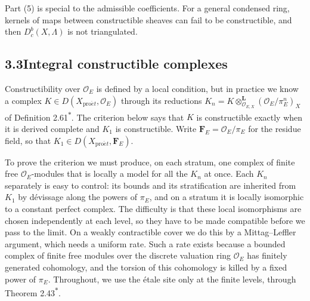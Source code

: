 \documentclass[11pt]{article}
\newcommand{\bpout}[1]{#1\textsuperscript{\hyperlink{bp-outside}{\ensuremath{\ast}}}}
\providecommand{\Dbc}{}\renewcommand{\Dbc}{D^b_c}
\begin{document}
\label{bp12}%
Part (5) is special to the admissible coefficients. For a general condensed ring, kernels of maps between constructible sheaves can fail to be constructible, and then \(\Dbc(X,\Lambda)\) is not triangulated.


\subsection*{\texorpdfstring{3.3\quad Integral constructible complexes}{3.3 Integral constructible complexes}}
\label{bp13}%
\label{bp14}%
Constructibility over \(\mathcal O_E\) is defined by a local condition, but in practice we know a complex \(K\in D(X_{\mathrm{pro}\acute{e}t},\mathcal O_E)\) through its reductions \(K_n=K\otimes^{\mathbf L}_{\mathcal O_{E,X}}(\mathcal O_E/\pi_E^n)_X\) of Definition \bpout{2.61}. The criterion below says that \(K\) is constructible exactly when it is derived complete and \(K_1\) is constructible. Write \(\mathbf F_E=\mathcal O_E/\pi_E\) for the residue field, so that \(K_1\in D(X_{\mathrm{pro}\acute{e}t},\mathbf F_E)\).

To prove the criterion we must produce, on each stratum, one complex of finite free \(\mathcal O_E\)-modules that is locally a model for all the \(K_n\) at once. Each \(K_n\) separately is easy to control: its bounds and its stratification are inherited from \(K_1\) by dévissage along the powers of \(\pi_E\), and on a stratum it is locally isomorphic to a constant perfect complex. The difficulty is that these local isomorphisms are chosen independently at each level, so they have to be made compatible before we pass to the limit. On a weakly contractible cover we do this by a Mittag–Leffler argument, which needs a uniform rate. Such a rate exists because a bounded complex of finite free modules over the discrete valuation ring \(\mathcal O_E\) has finitely generated cohomology, and the torsion of this cohomology is killed by a fixed power of \(\pi_E\). Throughout, we use the étale site only at the finite levels, through Theorem \bpout{2.43}.
\end{document}
